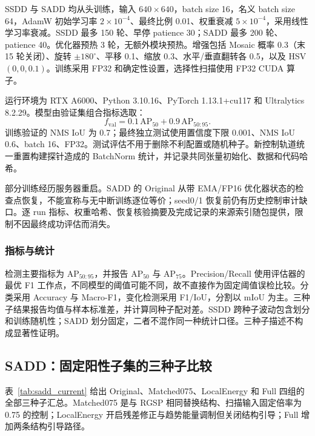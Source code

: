 SSDD 与 SADD 均从头训练，输入 $640\times640$，batch size 16，名义 batch size 64，AdamW 初始学习率 $2\times10^{-4}$、最终比例 0.01、权重衰减 $5\times10^{-4}$，采用线性学习率衰减。SSDD 最多 150 轮、早停 patience 30；SADD 最多 200 轮、patience 40。优化器预热 3 轮，无额外模块预热。增强包括 Mosaic 概率 0.3（末 15 轮关闭）、旋转 $\pm180^\circ$、平移 0.1、缩放 0.3、水平/垂直翻转各 0.5，以及 HSV $(0,0,0.1)$。训练采用 FP32 和确定性设置，选择性扫描使用 FP32 CUDA 算子。

运行环境为 RTX A6000、Python 3.10.16、PyTorch 1.13.1+cu117 和 Ultralytics 8.2.29。模型由验证集组合指标选取：
\begin{equation}
f_{\mathrm{val}}=0.1\,\mathrm{AP}_{50}+0.9\,\mathrm{AP}_{50:95}.
\end{equation}
训练验证的 NMS IoU 为 0.7；最终独立测试使用置信度下限 0.001、NMS IoU 0.6、batch 16、FP32。测试评估不用于删除不利配置或随机种子。新控制轨道统一重置构建探针造成的 BatchNorm 统计，并记录共同张量初始化、数据和代码哈希。

部分训练经历服务器重启。SADD 的 Original 从带 EMA/FP16 优化器状态的检查点恢复，不能宣称与无中断训练逐位等价；seed0/1 恢复前仍有历史控制审计缺口。逐 run 指标、权重哈希、恢复核验摘要及完成记录的来源索引随包提供，限制不因最终成功评估而消失。

\subsubsection{指标与统计}
检测主要指标为 $\mathrm{AP}_{50:95}$，并报告 $\mathrm{AP}_{50}$ 与 $\mathrm{AP}_{75}$。Precision/Recall 使用评估器的最优 F1 工作点，不同模型的阈值可能不同，故不直接作为固定阈值误检比较。分类采用 Accuracy 与 Macro-F1，变化检测采用 F1/IoU，分割以 mIoU 为主。三种子结果报告均值与样本标准差，并计算同种子配对差。SSDD 跨种子波动包含划分和训练随机性；SADD 划分固定，二者不混作同一种统计口径。三种子描述不构成显著性证明。

\subsection{SADD：固定阳性子集的三种子比较}
表~\ref{tab:sadd_current} 给出 Original、Matched075、LocalEnergy 和 Full 四组的全部三种子汇总。Matched075 是与 RGSP 相同替换结构、扫描输入固定倍率为 0.75 的控制；LocalEnergy 开启残差修正与趋势能量调制但关闭结构引导；Full 增加两条结构引导路径。

